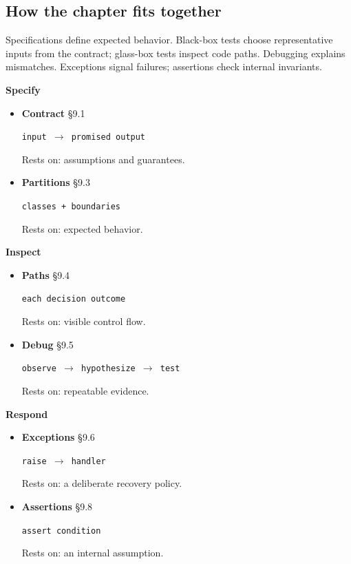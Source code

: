 \documentclass[11pt]{article}
\begin{document}
\begin{keepsection}
\section{How the chapter fits together}

Specifications define expected behavior. Black-box tests choose representative inputs from the contract; glass-box tests inspect code paths. Debugging explains mismatches. Exceptions signal failures; assertions check internal invariants.

\textbf{Specify}

\begin{itemize}
\item {}
\textbf{Contract} \hfill{\small\color{FAUblue}§9.1}

\texttt{input \ensuremath{\to} promised output}

Rests on: assumptions and guarantees.
\item {}
\textbf{Partitions} \hfill{\small\color{FAUblue}§9.3}

\texttt{classes + boundaries}

Rests on: expected behavior.
\end{itemize}

\textbf{Inspect}

\begin{itemize}
\item {}
\textbf{Paths} \hfill{\small\color{FAUblue}§9.4}

\texttt{each decision outcome}

Rests on: visible control flow.
\item {}
\textbf{Debug} \hfill{\small\color{FAUblue}§9.5}

\texttt{observe \ensuremath{\to} hypothesize \ensuremath{\to} test}

Rests on: repeatable evidence.
\end{itemize}

\textbf{Respond}

\begin{itemize}
\item {}
\textbf{Exceptions} \hfill{\small\color{FAUblue}§9.6}

\texttt{raise \ensuremath{\to} handler}

Rests on: a deliberate recovery policy.
\item {}
\textbf{Assertions} \hfill{\small\color{FAUblue}§9.8}

\texttt{assert condition}

Rests on: an internal assumption.
\end{itemize}
\end{keepsection}
\end{document}
